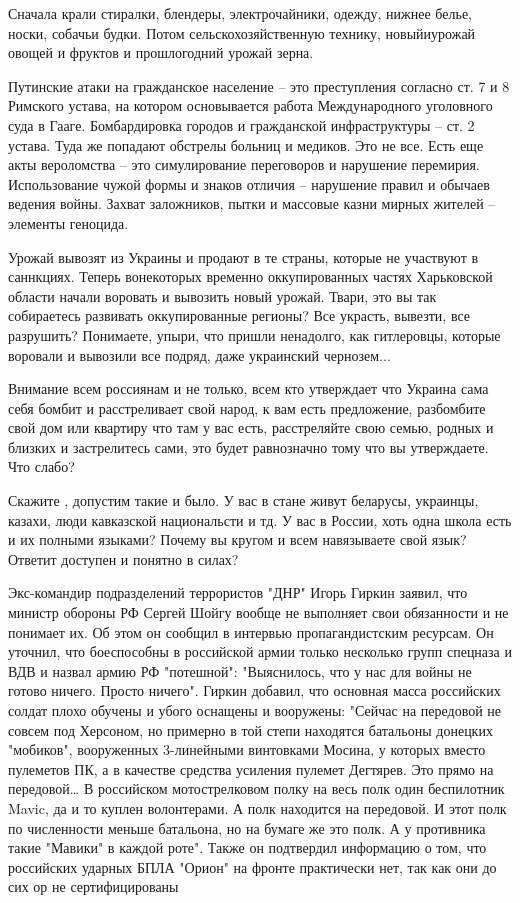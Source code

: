 Сначала крали стиралки, блендеры, электрочайники, одежду, нижнее белье, носки,
собачьи будки. Потом сельскохозяйственную технику, новыйиурожай овощей и
фруктов и прошлогодний урожай зерна.

Путинские атаки на гражданское население – это преступления согласно ст. 7 и 8
Римского устава, на котором основывается работа Международного уголовного суда
в Гааге. Бомбардировка городов и гражданской инфраструктуры – ст. 2 устава.
Туда же попадают обстрелы больниц и медиков. Это не все. Есть еще акты
вероломства – это симулирование переговоров и нарушение перемирия.
Использование чужой формы и знаков отличия – нарушение правил и обычаев ведения
войны. Захват заложников, пытки и массовые казни мирных жителей – элементы
геноцида.

Урожай вывозят из Украины и продают в те страны, которые не участвуют в
саннкциях. Теперь вонекоторых временно оккупированных частях Харьковской
области начали воровать и вывозить новый урожай. Твари, это вы так собираетесь
развивать оккупированные регионы? Все украсть, вывезти, все разрушить?
Понимаете, упыри, что пришли ненадолго, как гитлеровцы, которые воровали и
вывозили все подряд, даже украинский чернозем...

Внимание всем россиянам и не только, всем кто утверждает что Украина сама себя
бомбит и расстреливает свой народ, к вам есть предложение, разбомбите свой дом
или квартиру что там у вас есть, расстреляйте свою семью, родных и близких и
застрелитесь сами, это будет равнозначно тому что вы утверждаете. Что слабо?

Скажите , допустим такие и было. У вас в стане живут беларусы, украинцы,
казахи, люди кавказской национальсти и тд.  У вас в России, хоть одна школа
есть и их полными языками?  Почему вы кругом и всем навязываете свой язык?
Ответит доступен и понятно в силах?

Экс-командир подразделений террористов "ДНР" Игорь Гиркин заявил, что министр обороны РФ Сергей Шойгу вообще не выполняет свои обязанности и не понимает их. Об этом он сообщил в интервью пропагандистским ресурсам.
Он уточнил, что боеспособны в российской армии только несколько групп спецназа и ВДВ и назвал армию РФ "потешной":
"Выяснилось, что у нас для войны не готово ничего. Просто ничего".
Гиркин добавил, что основная масса российских солдат плохо обучены и убого оснащены и вооружены:
"Сейчас на передовой не совсем под Херсоном, но примерно в той степи находятся батальоны донецких "мобиков", вооруженных 3-линейными винтовками Мосина, у которых вместо пулеметов ПК, а в качестве средства усиления пулемет Дегтярев. Это прямо на передовой… В российском мотострелковом полку на весь полк один беспилотник Mavic, да и то куплен волонтерами. А полк находится на передовой. И этот полк по численности меньше батальона, но на бумаге же это полк. А у противника такие "Мавики" в каждой роте".
Также он подтвердил информацию о том, что российских ударных БПЛА "Орион" на фронте практически нет, так как они до сих ор не сертифицированы

